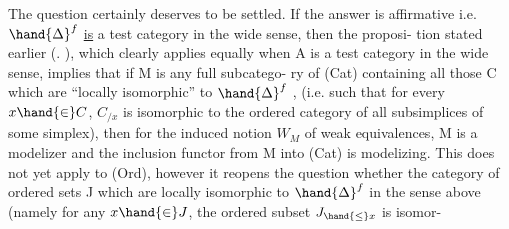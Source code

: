 The question certainly deserves to be settled. If the answer is
affirmative i.e. $\hand{\Delta}^{f}$ \uline{is} a test category in the wide sense, then the proposi-%
\margin{-} tion stated earlier (\hand{\S}. ), which clearly applies equally when A is a
test category in the wide sense, implies that if M is any full subcatego-%
ry of (Cat) containing all those C which are ``locally isomorphic'' to $\hand{\Delta}^{f}$ ,
(i.e. such that for every $x \hand{\in} C$, $C_{/x}$ is isomorphic to the ordered category
of all subsimplices of some simplex), then for the induced notion $W_M$ of
weak equivalences, M is a modelizer and the inclusion functor from M into
(Cat) is modelizing. This does not yet apply to (Ord), however it reopens
the question whether the category of  
 ordered sets J which are locally isomorphic to $\hand{\Delta}^{f}$ in the
sense above (namely for any $x \hand{\in} J$, the  ordered subset $J_{\hand{\leq} x}$ is isomor-%
